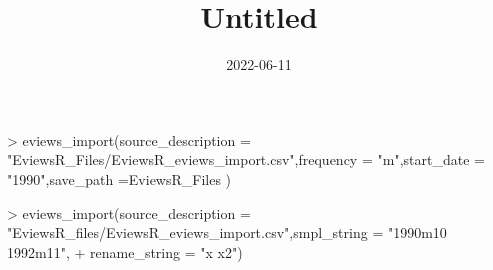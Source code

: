 \documentclass[
]{article}
\title{Untitled}
\author{}
\date{\vspace{-2.5em}2022-06-11}
\newenvironment{Shaded}{\begin{snugshade}}{\end{snugshade}}
\newcommand{\AttributeTok}[1]{\textcolor[rgb]{0.77,0.63,0.00}{#1}}
\newcommand{\FunctionTok}[1]{\textcolor[rgb]{0.00,0.00,0.00}{#1}}
\newcommand{\NormalTok}[1]{#1}
\newcommand{\SpecialCharTok}[1]{\textcolor[rgb]{0.00,0.00,0.00}{#1}}
\newcommand{\StringTok}[1]{\textcolor[rgb]{0.31,0.60,0.02}{#1}}
\begin{document}
\maketitle

{
\setcounter{tocdepth}{2}
\tableofcontents
}
\begin{Shaded}
\begin{Highlighting}[]
\SpecialCharTok{\textgreater{}} \FunctionTok{eviews\_import}\NormalTok{(}\AttributeTok{source\_description =} \StringTok{"EviewsR\_Files/EviewsR\_eviews\_import.csv"}\NormalTok{,}\AttributeTok{frequency =} \StringTok{"m"}\NormalTok{,}\AttributeTok{start\_date =} \StringTok{"1990"}\NormalTok{,}\AttributeTok{save\_path =}\StringTok{\textquotesingle{}EviewsR\_Files\textquotesingle{}}\NormalTok{ )}
\end{Highlighting}
\end{Shaded}

\begin{Shaded}
\begin{Highlighting}[]
\SpecialCharTok{\textgreater{}} \FunctionTok{eviews\_import}\NormalTok{(}\AttributeTok{source\_description =} \StringTok{"EviewsR\_files/EviewsR\_eviews\_import.csv"}\NormalTok{,}\AttributeTok{smpl\_string =} \StringTok{"1990m10 1992m11"}\NormalTok{,}
\SpecialCharTok{+} \AttributeTok{rename\_string =} \StringTok{"x x2"}\NormalTok{)}
\end{Highlighting}
\end{Shaded}
\end{document}
